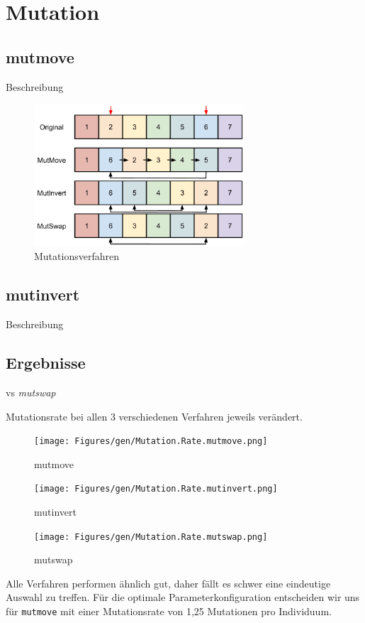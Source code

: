 \section{Mutation}\label{mutation}


\subsection{mutmove}
Beschreibung

\begin{figure}[h!]
  \centering
  \includegraphics[width=0.7\textwidth]{Figures/mutation.pdf}
  \caption{Mutationsverfahren}\label{fig.mutation}
\end{figure}

\subsection{mutinvert}
Beschreibung

\subsection{Ergebnisse}
vs \emph{mutswap}

Mutationsrate bei allen 3 verschiedenen Verfahren jeweils verändert.









\begin{figure}[!h]
  \texttt{[image: Figures/gen/Mutation.Rate.mutmove.png]}
  \caption{mutmove}\label{fig:mutmove}
\endminipage\hfill
{}
  \texttt{[image: Figures/gen/Mutation.Rate.mutinvert.png]}
  \caption{mutinvert}\label{fig:mutinvert}
\endminipage\hfill
{}%
  \texttt{[image: Figures/gen/Mutation.Rate.mutswap.png]}
  \caption{mutswap}\label{fig:mutswap}
\endminipage
\end{figure}

Alle Verfahren performen ähnlich gut, daher fällt es schwer eine eindeutige
Auswahl zu treffen.
Für die optimale Parameterkonfiguration entscheiden wir uns für
{\tt mutmove} mit einer Mutationsrate von 1,25 Mutationen pro Individuum.
